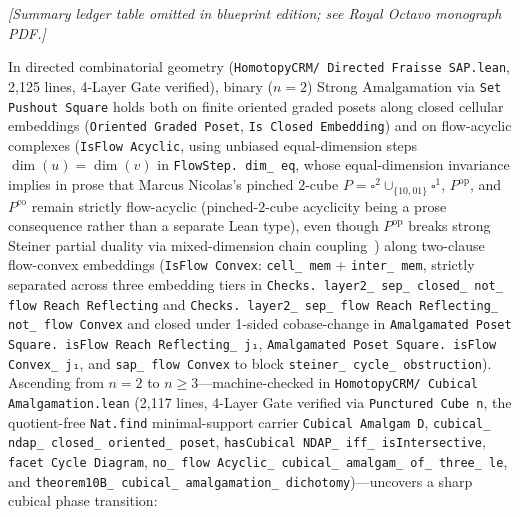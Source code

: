 \begin{center}\emph{[Summary ledger table omitted in blueprint edition; see Royal Octavo monograph PDF.]}\end{center}

In directed combinatorial geometry (\texttt{HomotopyCRM/ Directed Fraisse SAP.lean}, 2,125 lines, 4-Layer Gate verified), binary ($n = 2$) Strong Amalgamation via \texttt{Set Pushout Square} holds both on finite oriented graded posets along closed cellular embeddings (\texttt{Oriented Graded Poset}, \texttt{Is Closed Embedding}) and on flow-acyclic complexes (\texttt{IsFlow Acyclic}, using unbiased equal-dimension steps $\dim(u) = \dim(v)$ in \texttt{FlowStep. dim\_ eq}, whose equal-dimension invariance implies in prose that Marcus Nicolas's pinched $2$-cube $P = \square^2 \cup_{\{10, 01\}} \square^1$, $P^{\mathrm{op}}$, and $P^{\mathrm{co}}$ remain strictly flow-acyclic (pinched-$2$-cube acyclicity being a prose consequence rather than a separate Lean type), even though $P^{\mathrm{op}}$ breaks strong Steiner partial duality via mixed-dimension chain coupling~\cite{Masuda26}) along two-clause flow-convex embeddings (\texttt{IsFlow Convex}: \texttt{cell\_ mem} + \texttt{inter\_ mem}, strictly separated across three embedding tiers in \texttt{Checks. layer2\_ sep\_ closed\_ not\_ flow Reach Reflecting} and \texttt{Checks. layer2\_ sep\_ flow Reach Reflecting\_ not\_ flow Convex} and closed under 1-sided cobase-change in \texttt{Amalgamated Poset Square. isFlow Reach Reflecting\_ j₁}, \texttt{Amalgamated Poset Square. isFlow Convex\_ j₁}, and \texttt{sap\_ flow Convex} to block \texttt{steiner\_ cycle\_ obstruction}). Ascending from $n = 2$ to $n \ge 3$---machine-checked in \texttt{HomotopyCRM/ Cubical Amalgamation.lean} (2,117 lines, 4-Layer Gate verified via \texttt{Punctured Cube n}, the quotient-free \texttt{Nat.find} minimal-support carrier \texttt{Cubical Amalgam D}, \texttt{cubical\_ ndap\_ closed\_ oriented\_ poset}, \texttt{hasCubical NDAP\_ iff\_ isIntersective}, \texttt{facet Cycle Diagram}, \texttt{no\_ flow Acyclic\_ cubical\_ amalgam\_ of\_ three\_ le}, and \texttt{theorem10B\_ cubical\_ amalgamation\_ dichotomy})---uncovers a sharp cubical phase transition:

